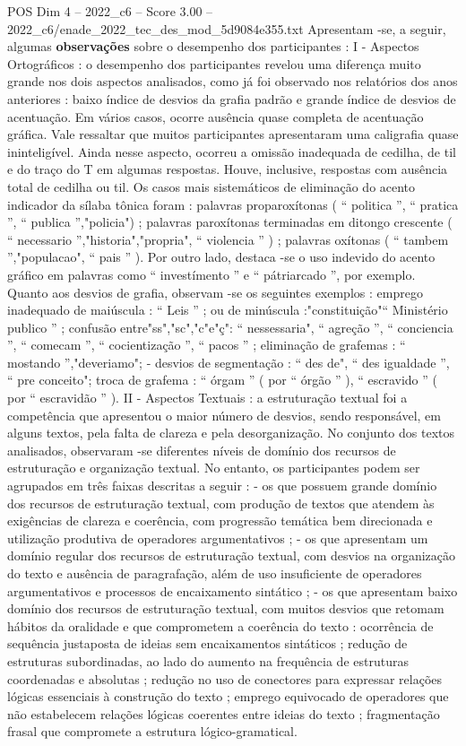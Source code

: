 \begin{textsample}{POS Dim 4 – 2022\_c6 – Score 3.00 – 2022\_c6/enade\_2022\_tec\_des\_mod\_5d9084e355.txt}
Apresentam -se, a seguir, algumas \textbf{observações} sobre o desempenho dos participantes : I - Aspectos Ortográficos : o desempenho dos participantes revelou uma diferença muito grande nos dois aspectos analisados, como já foi observado nos relatórios dos anos anteriores : baixo índice de desvios da grafia padrão e grande índice de desvios de acentuação.
Em vários casos, ocorre ausência quase completa de acentuação gráfica.
Vale ressaltar que muitos participantes apresentaram uma caligrafia quase ininteligível.
Ainda nesse aspecto, ocorreu a omissão inadequada de cedilha, de til e do traço do T em algumas respostas.
Houve, inclusive, respostas com ausência total de cedilha ou til.
Os casos mais sistemáticos de eliminação do acento indicador da sílaba tônica foram : palavras proparoxítonas ( “ politica ”, “ pratica ”, “ publica ”,"policia") ; palavras paroxítonas terminadas em ditongo crescente ( “ necessario ”,"historia","propria", “ violencia ” ) ; palavras oxítonas ( “ tambem ”,"populacao", “ pais ” ).
Por outro lado, destaca -se o uso indevido do acento gráfico em palavras como “ investímento ” e “ pátriarcado ”, por exemplo.
Quanto aos desvios de grafia, observam -se os seguintes exemplos : emprego inadequado de maiúscula : “ Leis ” ; ou de minúscula :"constituição"“ Ministério publico ” ; confusão entre"ss","sc","c"e"ç": “ nessessaria", “ agreção ”, “ conciencia ”, “ comecam ”, “ cocientização ”, “ pacos ” ; eliminação de grafemas : “ mostando ”,"deveriamo"; - desvios de segmentação : “ des de", “ des igualdade ”, “ pre conceito"; troca de grafema : “ órgam ” ( por “ órgão ” ), “ escravido ” ( por “ escravidão ” ).
II - Aspectos Textuais : a estruturação textual foi a competência que apresentou o maior número de desvios, sendo responsável, em alguns textos, pela falta de clareza e pela desorganização.
No conjunto dos textos analisados, observaram -se diferentes níveis de domínio dos recursos de estruturação e organização textual.
No entanto, os participantes podem ser agrupados em três faixas descritas a seguir : - os que possuem grande domínio dos recursos de estruturação textual, com produção de textos que atendem às exigências de clareza e coerência, com progressão temática bem direcionada e utilização produtiva de operadores argumentativos ; - os que apresentam um domínio regular dos recursos de estruturação textual, com desvios na organização do texto e ausência de paragrafação, além de uso insuficiente de operadores argumentativos e processos de encaixamento sintático ; - os que apresentam baixo domínio dos recursos de estruturação textual, com muitos desvios que retomam hábitos da oralidade e que comprometem a coerência do texto : ocorrência de sequência justaposta de ideias sem encaixamentos sintáticos ; redução de estruturas subordinadas, ao lado do aumento na frequência de estruturas coordenadas e absolutas ; redução no uso de conectores para expressar relações lógicas essenciais à construção do texto ; emprego equivocado de operadores que não estabelecem relações lógicas coerentes entre ideias do texto ; fragmentação frasal que compromete a estrutura lógico-gramatical.

\end{textsample}
